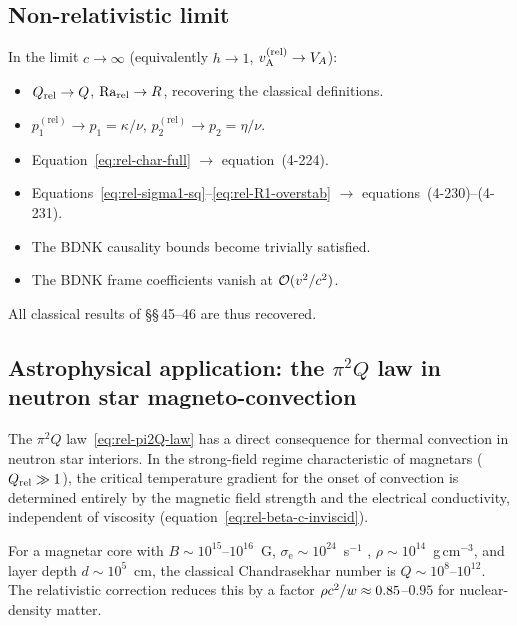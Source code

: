 \subsection{Non-relativistic limit}
\label{subsec:rel-46-NR}

In the limit $c\to\infty$ (equivalently $h\to 1$, $v_{\mathrm{A}}^{(\mathrm{rel})}
\to V_{A}$):
\begin{itemize}
  \item $Q_{\mathrm{rel}}\to Q$, $\mathrm{Ra}_{\mathrm{rel}}\to R$, recovering the classical
    definitions.
  \item $p_{1}^{(\mathrm{rel})}\to p_{1} = \kappa/\nu$, \;
    $p_{2}^{(\mathrm{rel})}\to p_{2} = \eta/\nu$.
  \item Equation~\eqref{eq:rel-char-full} $\to$ equation~(4-224).
  \item Equations~\eqref{eq:rel-sigma1-sq}--\eqref{eq:rel-R1-overstab}
    $\to$ equations~(4-230)--(4-231).
  \item The BDNK causality bounds become trivially satisfied.
  \item The BDNK frame coefficients vanish at $\mathcal{O}(v^{2}/c^{2})$.
\end{itemize}
All classical results of \S\S\,45--46 are thus recovered.


\subsection{Astrophysical application: the $\pi^{2}Q$ law in neutron
  star magneto-convection}
\label{subsec:rel-46-NS-application}

The $\pi^{2}Q$ law~\eqref{eq:rel-pi2Q-law} has a direct consequence
for thermal convection in neutron star interiors.  In the strong-field
regime characteristic of magnetars ($Q_{\mathrm{rel}} \gg 1$), the critical
temperature gradient for the onset of convection is determined
entirely by the magnetic field strength and the electrical conductivity,
independent of viscosity (equation~\eqref{eq:rel-beta-c-inviscid}).

For a magnetar core with $B \sim 10^{15}$--$10^{16}$~G,
$\sigma_{\mathrm{e}} \sim 10^{24}$~s$^{-1}$
\citep{YakovlevPethick2004},
$\rho \sim 10^{14}$~g\,cm$^{-3}$, and layer depth $d \sim 10^{5}$~cm,
the classical Chandrasekhar number is $Q \sim 10^{8}$--$10^{12}$.
The relativistic correction reduces this by a factor
$\rho c^{2}/w \approx 0.85$--$0.95$ for nuclear-density matter.

